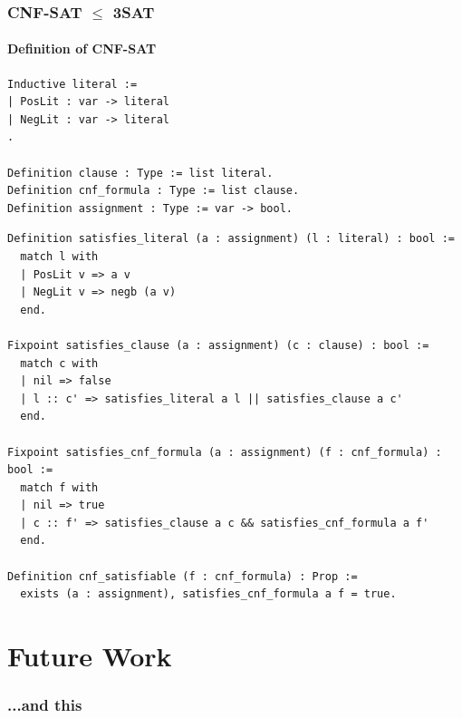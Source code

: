\documentclass{beamer}
\begin{document}
\begin{frame}[fragile]
  \frametitle{CNF-SAT $\leq$ 3SAT}
  \framesubtitle{Definition of CNF-SAT}

  \begin{verbatim}
Inductive literal :=
| PosLit : var -> literal
| NegLit : var -> literal
.

Definition clause : Type := list literal.
Definition cnf_formula : Type := list clause.
Definition assignment : Type := var -> bool.
  \end{verbatim}
\end{frame}

\begin{frame}[fragile]

  \begin{verbatim}
Definition satisfies_literal (a : assignment) (l : literal) : bool :=
  match l with
  | PosLit v => a v
  | NegLit v => negb (a v)
  end.

Fixpoint satisfies_clause (a : assignment) (c : clause) : bool :=
  match c with
  | nil => false
  | l :: c' => satisfies_literal a l || satisfies_clause a c'
  end.

Fixpoint satisfies_cnf_formula (a : assignment) (f : cnf_formula) : bool :=
  match f with
  | nil => true
  | c :: f' => satisfies_clause a c && satisfies_cnf_formula a f'
  end.

Definition cnf_satisfiable (f : cnf_formula) : Prop :=
  exists (a : assignment), satisfies_cnf_formula a f = true.
  \end{verbatim}
\end{frame}

\section{Future Work}

\begin{frame}
  \frametitle{...and this}
\end{frame}
\end{document}
